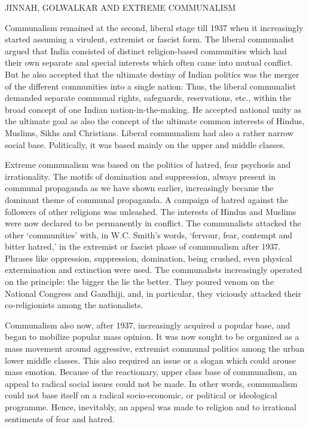 JINNAH, GOLWALKAR AND EXTREME COMMUNALISM 

Communalism remained at the second, liberal stage till 1937 when it increasingly started assuming a virulent, extremist or fascist form. The liberal communalist argued that India consisted of distinct religion-based communities which had their own separate and special interests which often came into mutual conflict. But he also accepted that the ultimate destiny of Indian politics was the merger of the different communities into a single nation: Thus, the liberal communalist demanded separate communal rights, safeguards, reservations, etc., within the broad concept of one Indian nation-in-the-making. He accepted national unity as the ultimate goal as also the concept of the ultimate common interests of Hindus, Muslims, Sikhs and Christians. Liberal communalism had also a rather narrow social base. Politically, it was based mainly on the upper and middle classes. 

Extreme communalism was based on the politics of hatred, fear psychosis and irrationality. The motifs of domination and suppression, always present in communal propaganda as we have shown earlier, increasingly became the dominant theme of communal propaganda. A campaign of hatred against the followers of other religions was unleashed. The interests of Hindus and Muslims were now declared to be permanently in conflict. The communalists attacked the other ‘communities’ with, in W.C. Smith’s words, ‘fervour, fear, contempt and bitter hatred,’ in the extremist or fascist phase of communalism after 1937. Phrases like oppression, suppression, domination, being crushed, even physical extermination and extinction were used. The communalists increasingly operated on the principle: the bigger the lie the better. They poured venom on the National Congress and Gandhiji, and, in particular, they viciously attacked their co-religionists among the nationalists. 

Communalism also now, after 1937, increasingly acquired a popular base, and began to mobilize popular mass opinion. It was now sought to be organized as a mass movement around aggressive, extremist communal politics among the urban lower middle classes. This also required an issue or a slogan which could arouse mass emotion. Because of the reactionary, upper class base of communalism, an appeal to radical social issues could not be made. In other words, communalism could not base itself on a radical socio-economic, or political or ideological programme. Hence, inevitably, an appeal was made to religion and to irrational sentiments of fear and hatred. 

